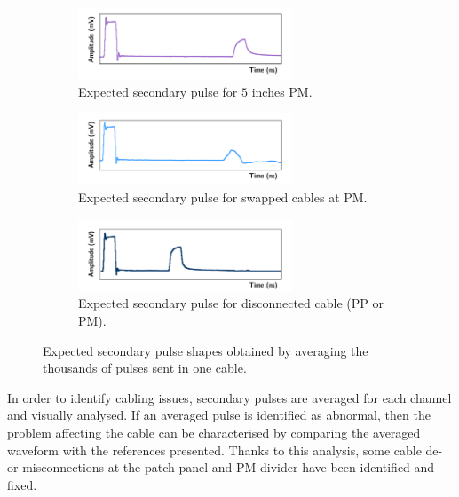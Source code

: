 \begin{figure}[h!]
  \centering
  \begin{subfigure}[b]{1\textwidth}
    \centering
    \includegraphics[width=0.7\textwidth]{commissioning/fig_commissioning/normal_pulse_5.pdf}
    \captionsetup{justification=centering}
    \caption{Expected secondary pulse for $5$ inches PM.
      \label{subfig:normal_5}}
  \end{subfigure}
  \begin{subfigure}[b]{1\textwidth}
    \centering
    \includegraphics[width=0.7\textwidth]{commissioning/fig_commissioning/anormal_pulse.pdf}
    \captionsetup{justification=centering}
    \caption{Expected secondary pulse for swapped cables at PM.
      \label{subfig:}}
  \end{subfigure}
  \begin{subfigure}[b]{1\textwidth}
    \centering
    \includegraphics[width=0.7\textwidth]{commissioning/fig_commissioning/anormal_pulse_misco.pdf}
    \captionsetup{justification=centering}
    \caption{Expected secondary pulse for disconnected cable (PP or PM).
      \label{subfig:}}
  \end{subfigure}
  \caption{Expected secondary pulse shapes obtained by averaging the thousands of pulses sent in one cable.
    \label{fig:pulse_ex}}
\end{figure}

In order to identify cabling issues, secondary pulses are averaged for each channel and visually analysed.
If an averaged pulse is identified as abnormal, then the problem affecting the cable can be characterised by comparing the averaged waveform with the references presented.
Thanks to this analysis, some cable de- or misconnections at the patch panel and PM divider have been identified and fixed.


